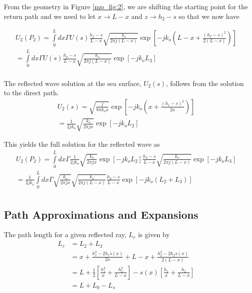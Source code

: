From the geometry in Figure \ref{mp_fig:2}, we are shifting the starting point for the return path and we need to let $x \rightarrow L-x$ and $z \rightarrow h_2-s$ so that we now have

\begin{equation}
\begin{gathered}
U_2(P_2) = \int\limits_{0}^{L}dx\Gamma U(s)\frac{h_2-s}{L-x}\sqrt{\frac{k_o}{2\pi j (L-x)}}\exp\left[-jk_o\left(L-x +\frac{(h_2-s)^2}{2(L-x)} \right) \right] \\
= \int\limits_{0}^{L}dx\Gamma U(s)\frac{h_2-s}{L-x}\sqrt{\frac{k_o}{2\pi j (L-x)}}\exp\left[-jk_oL_3\right] \\
\end{gathered}
\label{mp_eq:11aag}
\end{equation}
\renewcommand{\baselinestretch}{2} \small\normalsize

The reflected wave solution at the sea surface, $U_2(s)$, follows from the solution to the direct path.
\begin{equation}
\begin{gathered}
U_2(s) = \sqrt{\frac{j}{8\pi k_ox}}\exp\left[-jk_o\left(x + \frac{(h_1-s)^2}{2x}\right) \right]\\
= \frac{1}{2jk_o}\sqrt{\frac{k_o}{2\pi jx}}\exp\left[-jk_oL_2\right]
\end{gathered}
\label{mp_eq:11ae}
\end{equation}
\renewcommand{\baselinestretch}{2} \small\normalsize

This yields the full solution for the reflected wave as 
\begin{equation}
\begin{gathered}
U_2(P_2) = \int\limits_{0}^{L}dx\Gamma \frac{1}{2jk_o}\sqrt{\frac{k_o}{2\pi jx}}\exp\left[-jk_oL_2\right]\frac{h_2-s}{L-x}\sqrt{\frac{k_o}{2\pi j (L-x)}}\exp\left[-jk_oL_3 \right]  \\
= \frac{1}{2jk_o}\int\limits_{0}^{L}dx\Gamma \sqrt{\frac{k_o}{2\pi jx}}\sqrt{\frac{k_o}{2\pi j (L-x)}}\frac{h_2-s}{L-x}\exp\left[-jk_o\left( L_2 + L_3\right) \right]  \\
\label{mp_eq:12g}
\end{gathered}
\end{equation}
\renewcommand{\baselinestretch}{2} \small\normalsize

\subsection{Path Approximations and Expansions}
The path length for a given reflected ray, $L_r$ is given by
\begin{equation}
\begin{aligned}
L_r &= L_2 + L_3 \\
& = x + \frac{h_1^2-2h_1s(x)}{2x} +  L-x + \frac{h_2^2 - 2h_2s(x)}{2\left(L-x\right)} \\
& = L + \frac{1}{2}\left[\frac{h_1^2}{x} + \frac{h_2^2}{L-x} \right] - s(x)\left[ \frac{h_1}{x} + \frac{h_2}{L-x}\right] \\
&= L + L_0 - L_s
\end{aligned}
\label{mp_eq:13}
\end{equation}
\renewcommand{\baselinestretch}{2} \small\normalsize

